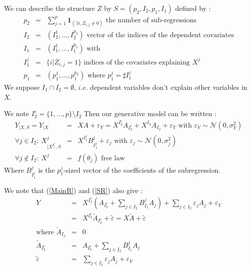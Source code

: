 \documentclass[11pt,a4paper]{article}
\begin{document}
	We can describe the structure $Z$ by $S=(p_2,I_2,p_1,I_1)$ defined by :
	\begin{eqnarray}
		p_2&=& \sum_{j=1}^p\mathbf{1}_{(\exists i, Z_{i,j}\neq 0)} \textrm{ the number of sub-regressions}\\
		I_2&=&(I_2^1,\dots,I_2^{p_2}) \textrm{ vector of the indices of the dependent covariates}\\
		I_1&=&(I_1^1,\dots,I_1^{p_2}) \textrm{ with}		\\
		I_1^j &=& \{i |Z_{i,j}=1 \} \textrm{ indices of the covariates explaining $X^j$} \\
		p_1&=&(p_1^1,\dots,p_1^{p_2}) \textrm{ where }p_1^j=\sharp I_1^j 
	\end{eqnarray}
	We suppose $I_1\cap I_2=\emptyset$, $i.e.$ dependent variables don't explain other variables in $X$. 
	
	We note $I_2^c=\{1,\dots,p\}\setminus I_2$
Then our generative model can be written :
\begin{eqnarray}
	Y_{|X,S}=Y_{|X}&=&XA+\varepsilon_Y= X^{I_2^c}A_{I_2^c}+X^{I_2}A_{I_2}+\varepsilon_Y \textrm{ with } \varepsilon_Y \sim \mathcal{N}(0,\sigma_Y^2) \label{MainR}\\
	\forall j \in I_2 : \  X^j_{|X^{I_1^j},S}&=&X^{I_1^j}B_{I_1^j}^j + \varepsilon_{j} \textrm{ with } \varepsilon_j \sim \mathcal{N}(0,\sigma_j^2) \label{SR}\\
    \forall j \notin I_2 : \ X^j &=& f(\theta_j) \textrm{ free law}	
\end{eqnarray}
Where $B_{I_1^j}^j$ is the $p_1^j$-sized vector of the coefficients of the subregression.

We note that (\ref{MainR}) and (\ref{SR}) also give :
\begin{eqnarray}
	Y&=&X^{I_2^c} (A_{I_2^c}+ \sum_{j \in I_2}B^{j}_{I_1}A_{j})+  \sum_{j \in I_2}\varepsilon_{j}A_{j}+\varepsilon_Y \\
					&=& X^{I_2^c}\tilde{A}_{I_2^c}+ \tilde{\varepsilon}=X\tilde{A}+ \tilde{\varepsilon}\label{Trueexpl} \\
			\textrm{where }		\tilde{A}_{I_2}&=&0 \\
					\tilde{A}_{I_2^c}&=&A_{I_2^c}+ \sum_{j \in I_2}B^{j}_{I_1}A_{j} \\
					\tilde{\varepsilon}&=&\sum_{j \in I_2}\varepsilon_{j}A_{j}+\varepsilon_Y 
\end{eqnarray}
\end{document}
